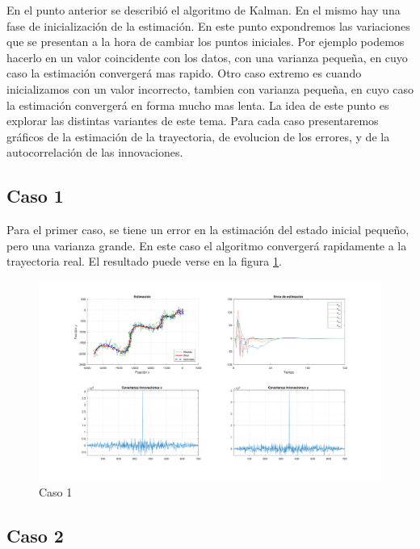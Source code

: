 
	En el punto anterior se describió el algoritmo de Kalman. En el mismo hay una fase de inicialización de la estimación. En este punto expondremos las variaciones que se presentan a la hora de cambiar los puntos iniciales. Por ejemplo podemos hacerlo en un valor coincidente con los datos, con una varianza pequeña, en cuyo caso la estimación convergerá mas rapido. Otro caso extremo es cuando inicializamos con un valor incorrecto, tambien con varianza pequeña, en cuyo caso la estimación convergerá en forma mucho mas lenta. La idea de este punto es explorar las distintas variantes de este tema. Para cada caso presentaremos gráficos de la estimación de la trayectoria, de evolucion de los errores, y de la autocorrelación de las innovaciones.
	
	\subsection{Caso 1}
	
		Para el primer caso, se tiene un error en la estimación del estado inicial pequeño, pero una varianza grande. En este caso el algoritmo convergerá rapidamente a la trayectoria real. El resultado puede verse en la figura \ref{fig:ej3a}.
	
		\begin{figure}[H]
			\centering
			\includegraphics[scale=0.5,trim={6,5cm 0 0 0}]{Figuras/graf_ej3a.pdf}
			\caption{Caso 1}
			\label{fig:ej3a}
		\end{figure}
	
	\subsection{Caso 2}
	
